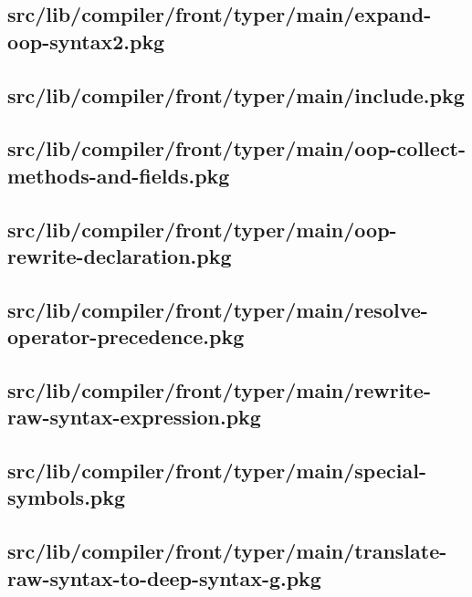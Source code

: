 \subsection{src/lib/compiler/front/typer/main/expand-oop-syntax2.pkg}


\subsection{src/lib/compiler/front/typer/main/include.pkg}


\subsection{src/lib/compiler/front/typer/main/oop-collect-methods-and-fields.pkg}


\subsection{src/lib/compiler/front/typer/main/oop-rewrite-declaration.pkg}


\subsection{src/lib/compiler/front/typer/main/resolve-operator-precedence.pkg}


\subsection{src/lib/compiler/front/typer/main/rewrite-raw-syntax-expression.pkg}


\subsection{src/lib/compiler/front/typer/main/special-symbols.pkg}


\subsection{src/lib/compiler/front/typer/main/translate-raw-syntax-to-deep-syntax-g.pkg}


